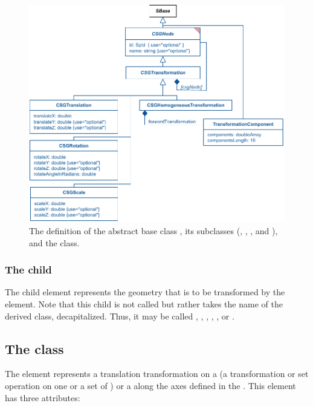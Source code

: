 \begin{figure}[ht]
  \includegraphics{figs/CSGTransformation-uml}
  \caption{The definition of the abstract base class \CSGTransformation, its subclasses (\CSGTranslation, \CSGRotation, \CSGScale, and \CSGHomogeneousTransformation), and the \TransformationComponent class.}
  \label{CSGTransformation-uml}
  \label{CSGRotation-uml}
  \label{CSGScale-uml}
  \label{CSGHomogeneousTransformation-uml}
  \label{TransformationComponent-uml}
\end{figure}

\subsubsection{The \fixttspace{} child}

The child  element represents the geometry that is to be transformed by the \CSGTransformation element.  Note that this child is not called  but rather takes the name of the derived class, decapitalized.  Thus, it may be called , , , , , or .


\subsection{The  class}
\label{csgtranslation-class}
The \CSGTranslation element represents a translation transformation on a \CSGNode (a transformation or set operation on one or a set of \CSGPrimitives) or a \CSGPrimitive along the axes defined in the \Geometry. This element has three attributes:

